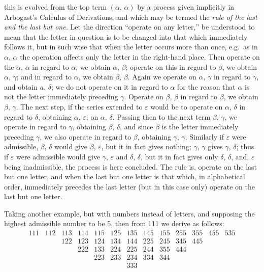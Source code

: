 \documentclass[11pt,a4paper]{book}
\begin{document}
\noindent
this is evolved from the top term $(\alpha,\,\alpha)$ by a process given implicitly in Arbogast's
Calculus of Derivations, and which may be termed the \textit{rule of the last and the last but one.} Let the direction ``operate on any letter,'' be understood to mean that the
letter in question is to be changed into that which immediately follows it, but in
such wise that when the letter occurs more than once, e.g.\ as in $\alpha,\,\alpha$ the operation
affects only the letter in the right-hand place. Then operate on the $\alpha,\,\alpha$ in regard
to $\alpha$, we obtain $\alpha,\,\beta$; operate on this in regard to $\beta$, we obtain $\alpha,\,\gamma$; and in regard
to $\alpha$, we obtain $\beta,\,\beta$. Again we operate on $\alpha,\,\gamma$ in regard to $\gamma$, and obtain $a,\,\delta$; we
do not operate on it in regard to $\alpha$ for the reason that $\alpha$ is not the letter immediately
preceding $\gamma$. Operate on $\beta,\,\beta$ in regard to $\beta$, we obtain $\beta,\,\gamma$. The next step, if the
series extended to $\varepsilon$ would be to operate on $\alpha,\,\delta$ in regard to $\delta$, obtaining $\alpha,\,\varepsilon$; on
$\alpha,\,\delta$. Passing then to the next term $\beta,\,\gamma$, we operate in regard to $\gamma$, obtaining $\beta,\,\delta$,
and since $\beta$ is the letter immediately preceding $\gamma$, we also operate in regard to $\beta$,
obtaining $\gamma,\,\gamma$. Similarly if $\varepsilon$ were admissible, $\beta,\,\delta$ would give $\beta,\,\varepsilon$, but it in fact
gives nothing; $\gamma,\,\gamma$ gives $\gamma,\,\delta$; thus if $\varepsilon$ were admissible would give $\gamma,\,\varepsilon$ and $\delta,\,\delta$,
but it in fact gives only $\delta,\,\delta$, and, $\varepsilon$ being inadmissible, the process is here concluded.
The rule is, operate on the last but one letter, and when the last but one letter is that
which, in alphabetical order, immediately precedes the last letter (but in this case
only) operate on the last but one letter.

Taking another example, but with numbers instead of letters, and supposing the
highest admissible number to be 5, then from 111 we derive as follows:
\[
\begin{array}{ccccccccccccc}
111 & 112 & 113 & 114 & 115 & 125 & 135 & 145 & 155 & 255 & 355 & 455 & 535 \\
& & 122 & 123 & 124 & 134 & 144 & 225 & 245 & 345 & 445 & & \\
& & & 222 & 133 & 224 & 225 & 244 & 355 & 444 & & & \\
& & & & 223 & 233 & 234 & 334 & 344 & & & & \\
& & & & & & 333 & & & & & &
\end{array}
\]
\end{document}

